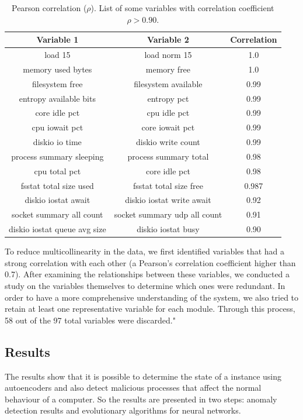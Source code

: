\documentclass{iosart2c}
\begin{document}
\begin{table}[h!]
\centering
\begin{tabular}{ccc}
\hline
Variable 1 & Variable 2 & Correlation \\ \hline
load 15 & load norm 15 & 1.0\\ 
memory used bytes & memory free & 1.0\\ 
filesystem free & filesystem available & 0.99\\ 
entropy available bits & entropy pct & 0.99\\ 
core idle pct & cpu idle pct & 0.99\\ 
cpu iowait pct & core iowait pct & 0.99\\ 
diskio io time & diskio write count & 0.99\\ 
process summary sleeping & process summary total & 0.98\\ 
cpu total pct & core idle pct & 0.98\\ 
fsstat total size used & fsstat total size free & 0.987\\ 
diskio iostat await & diskio iostat write await & 0.92\\ 
socket summary all count & socket summary udp all count & 0.91\\ 
diskio iostat queue avg size & diskio iostat busy & 0.90\\ \hline
\end{tabular}
\caption{Pearson correlation ($\rho$). List of some variables with correlation coefficient $\rho>0.90$.}
\label{tab_cor}
\end{table}

To reduce multicollinearity in the data, we first identified variables that had a strong correlation with each other (a Pearson's correlation coefficient higher than 0.7). After examining the relationships between these variables, we conducted a study on the variables themselves to determine which ones were redundant. In order to have a more comprehensive understanding of the system, we also tried to retain at least one representative variable for each module. Through this process, 58 out of the 97 total variables were discarded."


\subsection{Results}


The results show that it is possible to determine the state of a instance using autoencoders and also detect malicious processes that affect the normal behaviour of a computer. So the results are presented in two steps: anomaly detection results and evolutionary algorithms for neural networks.
\end{document}
